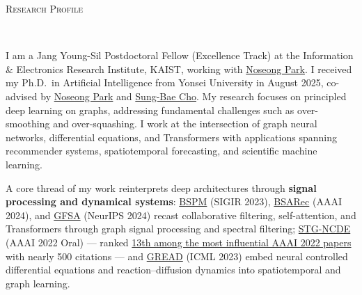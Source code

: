 \documentclass[10pt]{article}
\newenvironment{changemargin}[2]{
  \begin{list}{}{
    \setlength{\topsep}{0pt}
    \setlength{\leftmargin}{#1}
    \setlength{\rightmargin}{#2}
    \setlength{\listparindent}{\parindent}
    \setlength{\itemindent}{\parindent}
    \setlength{\parsep}{\parskip}
  }
  \item[]}{\end{list}
}
\newcommand{\lineover}{
	\begin{changemargin}{-0.05in}{-0.05in}
		\vspace*{-8pt}
		\hrulefill \\
		\vspace*{-2pt}
	\end{changemargin}
}
\newcommand{\header}[1]{
	\begin{changemargin}{-0.5in}{-0.5in}
		\scshape{#1}\\
  	\lineover
	\end{changemargin}
}
\newenvironment{body} {
	\vspace*{-16pt}
	\begin{changemargin}{-0.25in}{-0.5in}
  }
	{\end{changemargin}
}
\begin{document}
\header{Research Profile}
\begin{body}
    \vspace{14pt}
    \; I am a Jang Young-Sil Postdoctoral Fellow (Excellence Track) at the Information \& Electronics Research Institute, KAIST, working with \href{https://scholar.google.com/citations?user=VSuM3gYAAAAJ&hl=en}{Noseong Park}. I received my Ph.D.\ in Artificial Intelligence from Yonsei University in August 2025, co-advised by \href{https://scholar.google.com/citations?user=VSuM3gYAAAAJ&hl=en}{Noseong Park} and \href{https://scholar.google.com/citations?user=px5LGgMAAAAJ&hl=en}{Sung-Bae Cho}. My research focuses on principled deep learning on graphs, addressing fundamental challenges such as over-smoothing and over-squashing. I work at the intersection of graph neural networks, differential equations, and Transformers with applications spanning recommender systems, spatiotemporal forecasting, and scientific machine learning.

    \; A core thread of my work reinterprets deep architectures through \textbf{signal processing and dynamical systems}: \href{https://dl.acm.org/doi/10.1145/3539618.3591645}{BSPM} (SIGIR 2023), \href{https://ojs.aaai.org/index.php/AAAI/article/view/28747}{BSARec} (AAAI 2024), and \href{https://openreview.net/forum?id=ffNrpcBpi6}{GFSA} (NeurIPS 2024) recast collaborative filtering, self-attention, and Transformers through graph signal processing and spectral filtering; \href{https://ojs.aaai.org/index.php/AAAI/article/view/20587}{STG-NCDE} (AAAI 2022 Oral) --- ranked \href{https://www.paperdigest.org/2025/03/most-influential-aaai-papers-2025-03-version/}{13th among the most influential AAAI 2022 papers} with nearly 500 citations --- and \href{https://proceedings.mlr.press/v202/choi23a.html}{GREAD} (ICML 2023) embed neural controlled differential equations and reaction–diffusion dynamics into spatiotemporal and graph learning. 
    

\end{body}
\end{document}
